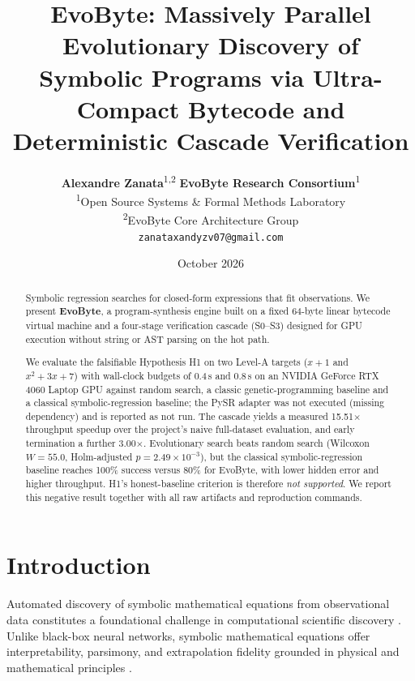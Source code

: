 \documentclass[11pt,a4paper]{article}
\title{\textbf{EvoByte: Massively Parallel Evolutionary Discovery of Symbolic Programs via Ultra-Compact Bytecode and Deterministic Cascade Verification}}
\author{
  \textbf{Alexandre Zanata}\textsuperscript{1,2} \quad \textbf{EvoByte Research Consortium}\textsuperscript{1} \\
  \textsuperscript{1}Open Source Systems \& Formal Methods Laboratory \\
  \textsuperscript{2}EvoByte Core Architecture Group \\
  \texttt{zanataxandyzv07@gmail.com}
}
\date{October 2026}
\begin{document}
\maketitle

\begin{abstract}
Symbolic regression searches for closed-form expressions that fit observations. We present
\textbf{EvoByte}, a program-synthesis engine built on a fixed 64-byte linear bytecode virtual
machine and a four-stage verification cascade (S0--S3) designed for GPU execution without string
or AST parsing on the hot path.

We evaluate the falsifiable Hypothesis H1 on two Level-A targets ($x+1$ and $x^2+3x+7$) with
wall-clock budgets of 0.4\,s and 0.8\,s on an NVIDIA GeForce RTX 4060 Laptop GPU against random
search, a classic genetic-programming baseline and a classical symbolic-regression baseline; the
PySR adapter was not executed (missing dependency) and is reported as not run. The cascade yields
a measured 15.51$\times$ throughput speedup over the project's naive full-dataset evaluation, and
early termination a further 3.00$\times$. Evolutionary search beats random search (Wilcoxon
$W = 55.0$, Holm-adjusted $p = 2.49 \times 10^{-3}$), but the classical symbolic-regression
baseline reaches 100\% success versus 80\% for EvoByte, with lower hidden error and higher
throughput. H1's honest-baseline criterion is therefore \emph{not supported}. We report this
negative result together with all raw artifacts and reproduction commands.
\end{abstract}

\section{Introduction}
Automated discovery of symbolic mathematical equations from observational data constitutes a foundational challenge in computational scientific discovery \cite{schmidt2009distilling, udrescu2020ai}. Unlike black-box neural networks, symbolic mathematical equations offer interpretability, parsimony, and extrapolation fidelity grounded in physical and mathematical principles \cite{cranmer2023interpretable}.
\end{document}
